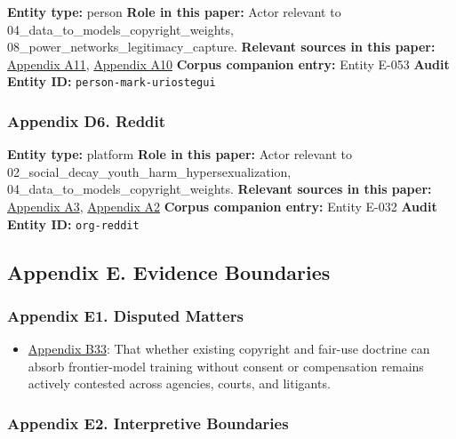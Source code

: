 \documentclass[
  american,
  11pt,
  letterpaper,
]{article}
\providecommand{\tightlist}{%
  \setlength{\itemsep}{0pt}\setlength{\parskip}{0pt}}
\begin{document}
\textbf{Entity type:} person \textbf{Role in this paper:} Actor relevant
to 04\_data\_to\_models\_copyright\_weights,
08\_power\_networks\_legitimacy\_capture. \textbf{Relevant sources in
this paper:}
\hyperref[ch-04-appendix-a11-ai-copyright-weights-a-new-frontier-in-intellectual-property-law]{Appendix
A11},
\hyperref[ch-04-appendix-a10-bipartisan-house-task-force-report-on-artificial-intelligence]{Appendix
A10} \textbf{Corpus companion entry:} Entity E-053 \textbf{Audit Entity
ID:} \texttt{person-mark-uriostegui}

\subsubsection{Appendix D6. Reddit}\label{ch-04-appendix-d6-reddit}

\textbf{Entity type:} platform \textbf{Role in this paper:} Actor
relevant to 02\_social\_decay\_youth\_harm\_hypersexualization,
04\_data\_to\_models\_copyright\_weights. \textbf{Relevant sources in
this paper:}
\hyperref[ch-04-appendix-a3-reddit-strikes-60m-deal-allowing-google-to-train-ai-models-on-its-posts-unveils-ipo-plans]{Appendix
A3},
\hyperref[ch-04-appendix-a2-language-models-are-unsupervised-multitask-learners]{Appendix
A2} \textbf{Corpus companion entry:} Entity E-032 \textbf{Audit Entity
ID:} \texttt{org-reddit}

\subsection{Appendix E. Evidence
Boundaries}\label{appendix-e.-evidence-boundaries-4}

\subsubsection{Appendix E1. Disputed
Matters}\label{ch-04-appendix-e1-disputed-matters}

\begin{itemize}
\tightlist
\item
  \hyperref[ch-04-appendix-b33-whether-existing-copyright-and-fair-use-doctrine-can-absorb-frontier-model-traini]{Appendix
  B33}: That whether existing copyright and fair-use doctrine can absorb
  frontier-model training without consent or compensation remains
  actively contested across agencies, courts, and litigants.
\end{itemize}

\subsubsection{Appendix E2. Interpretive
Boundaries}\label{ch-04-appendix-e2-interpretive-boundaries}
\end{document}
